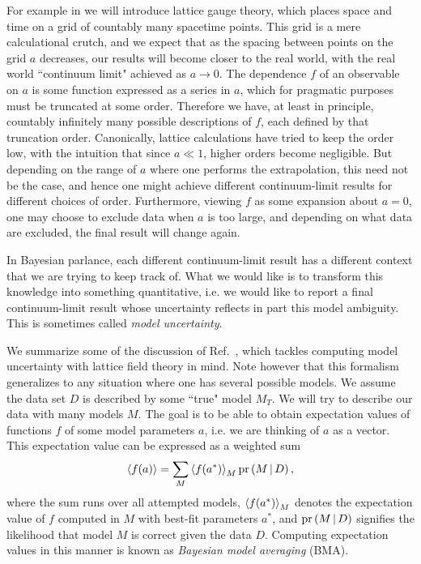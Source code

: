 For example in  we will introduce lattice gauge theory,
which places space and time on a grid of countably many spacetime points. This
grid is a mere calculational crutch, and we expect that as the spacing between
points on the grid $a$ decreases, our results will become closer to the real world,
with the real world ``continuum limit" achieved as $a\to 0$. The dependence $f$ of
an observable on $a$ is some function expressed as a series in $a$, which for
pragmatic purposes must be truncated at some order. Therefore we have, at least in
principle, countably infinitely many possible descriptions of $f$, each defined
by that truncation order. Canonically, lattice calculations have tried to keep
the order low, with the intuition that since $a\ll1$, higher orders become
negligible. But depending on the range of $a$ where one performs the
extrapolation, this need not be the case, and hence one might achieve different
continuum-limit results for different choices of order. Furthermore, viewing $f$
as some expansion about $a=0$, one may choose to exclude data when $a$ is too
large, and depending on what data are excluded, the final result will change
again.

In Bayesian parlance, each different continuum-limit result has a different
context that we are trying to keep track of. What we would like is to transform
this knowledge into something quantitative, i.e. we would like to report a final
continuum-limit result whose uncertainty reflects in part this model ambiguity.
This is sometimes called {\it model uncertainty}.

We summarize some of the discussion of Ref.~\cite{neil_improved_2024},
which tackles computing
model uncertainty with lattice field theory in mind. Note however that this
formalism generalizes to any situation where one has several possible models. 
We assume the data set $D$ is described by some ``true" model $M_T$.
We will try to describe our data with many models $M$.
The goal is to be able to obtain expectation values of functions $f$
of some model parameters $a$, i.e. we are thinking of $a$ as a vector.
This expectation value can be expressed as a weighted sum 
\begin{equation}\label{eq:BMAmean}
\ev{f(a)}=
\sum_M \ev{f(a^*)}_M \pr{M\given D},
\end{equation} 
where the sum runs over all attempted models, 
$\ev{f(a^*)}_M$ denotes the expectation value of $f$ computed in $M$ with best-fit
parameters $a^*$, and $\operatorname{pr}\left(M\,|\, D\right)$ signifies the likelihood that model $M$ 
is correct given the data $D$. Computing expectation values in this manner
is known as {\it Bayesian model averaging} (BMA).


